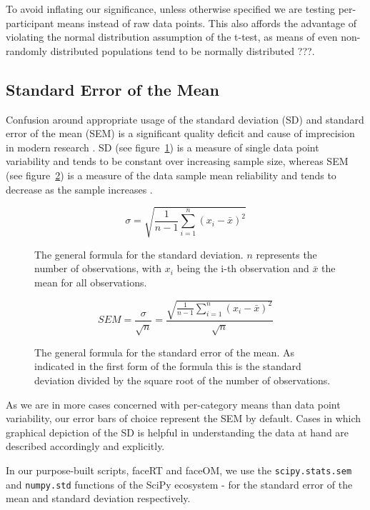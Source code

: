 	    To avoid inflating our significance, unless otherwise specified we are testing per-participant means instead of raw data points.
	    This also affords the advantage of violating the normal distribution assumption of the t-test, as means of even non-randomly distributed populations tend to be normally distributed ???.  
	\subsection{Standard Error of the Mean}\label{sec:m_sa_se}
	    Confusion around appropriate usage of the standard deviation (SD) and standard error of the mean (SEM) is a significant quality deficit and cause of imprecision in modern research \cite{Nagele2003}.
	    SD (see figure~\ref{eq:m_sa_sd}) is a measure of single data point variability and tends to be constant over increasing sample size, 
	    whereas SEM (see figure~\ref{eq:m_sa_se}) is a measure of the data sample mean reliability and tends to decrease as the sample increases \cite{Altman2005,Streiner1996}.
	    
	    \begin{multicols}{2}
		\begin{figure}[H]
		    \[ \sigma = \sqrt{\frac{1}{n-1} \sum\limits_{i=1}^n (x_i - \bar{x})^2} \]
		    \caption{The general formula for the standard deviation. $n$ represents the number of observations, with $x_i$ being the i-th observation and $\bar{x}$ the mean for all observations.}
		    \label{eq:m_sa_sd}
		\end{figure}
		\begin{figure}[H]
		    \[ SEM = \frac{\sigma}{\sqrt{n}} = \frac{\sqrt{\frac{1}{n-1} \sum\limits_{i=1}^n (x_i - \bar{x})^2}}{\sqrt{n}} \]
		    \caption{The general formula for the standard error of the mean. As indicated in the first form of the formula this is the standard deviation divided by the square root of the number of observations.}
		    \label{eq:m_sa_se}
		\end{figure}
	    \end{multicols}
	    
	    As we are in more cases concerned with per-category means than data point variability, our error bars of choice represent the SEM by default.
	    Cases in which graphical depiction of the SD is helpful in understanding the data at hand are described accordingly and explicitly.
	    
	    In our purpose-built scripts, faceRT\cite{faceRT} and faceOM\cite{faceOM}, we use the \colorbox{vlg}{\texttt{scipy.stats.sem}} and \colorbox{vlg}{\texttt{numpy.std}} functions of the SciPy ecosystem \cite{scipy,Oliphant2007} -
	    for the standard error of the mean and standard deviation respectively.
